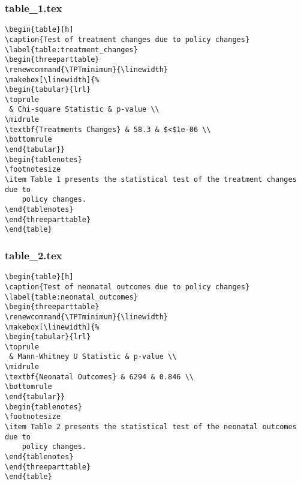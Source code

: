 \documentclass[11pt]{article}
\begin{document}
\subsubsection*{table\_1.tex}

\begin{Verbatim}[tabsize=4]
\begin{table}[h]
\caption{Test of treatment changes due to policy changes}
\label{table:treatment_changes}
\begin{threeparttable}
\renewcommand{\TPTminimum}{\linewidth}
\makebox[\linewidth]{%
\begin{tabular}{lrl}
\toprule
 & Chi-square Statistic & p-value \\
\midrule
\textbf{Treatments Changes} & 58.3 & $<$1e-06 \\
\bottomrule
\end{tabular}}
\begin{tablenotes}
\footnotesize
\item Table 1 presents the statistical test of the treatment changes due to
	policy changes.
\end{tablenotes}
\end{threeparttable}
\end{table}

\end{Verbatim}

\subsubsection*{table\_2.tex}

\begin{Verbatim}[tabsize=4]
\begin{table}[h]
\caption{Test of neonatal outcomes due to policy changes}
\label{table:neonatal_outcomes}
\begin{threeparttable}
\renewcommand{\TPTminimum}{\linewidth}
\makebox[\linewidth]{%
\begin{tabular}{lrl}
\toprule
 & Mann-Whitney U Statistic & p-value \\
\midrule
\textbf{Neonatal Outcomes} & 6294 & 0.846 \\
\bottomrule
\end{tabular}}
\begin{tablenotes}
\footnotesize
\item Table 2 presents the statistical test of the neonatal outcomes due to
	policy changes.
\end{tablenotes}
\end{threeparttable}
\end{table}

\end{Verbatim}




\end{document}

